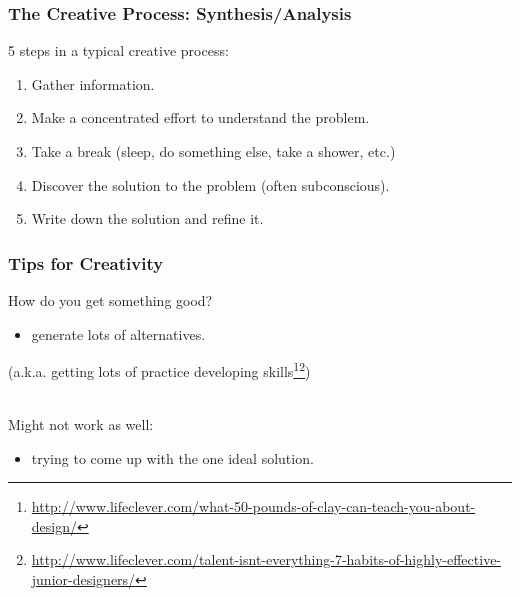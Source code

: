 \begin{frame}
\frametitle{The Creative Process: Synthesis/Analysis}

\begin{changemargin}{.5cm}
5 steps in a typical creative process:
\begin{enumerate}
\item Gather information.
\item Make a concentrated effort to understand the problem.
\item Take a break (sleep, do something else, take a shower, etc.)
\item Discover the solution to the problem (often subconscious).
\item Write down the solution and refine it.
\end{enumerate}
\end{changemargin}

\end{frame}

\begin{frame}
\frametitle{Tips for Creativity}

\begin{changemargin}{2.5cm}
How do you get something good?

\begin{itemize}
\item generate lots of alternatives.
\end{itemize}

(a.k.a. getting lots of practice developing 
skills\footnote{\tiny \url{http://www.lifeclever.com/what-50-pounds-of-clay-can-teach-you-about-design/}}\footnote{\tiny \url{http://www.lifeclever.com/talent-isnt-everything-7-habits-of-highly-effective-junior-designers/}})

~\\[1em]
Might not work as well:

\begin{itemize}
\item trying to come up with the one ideal solution.
\end{itemize}
\end{changemargin}

\end{frame}

